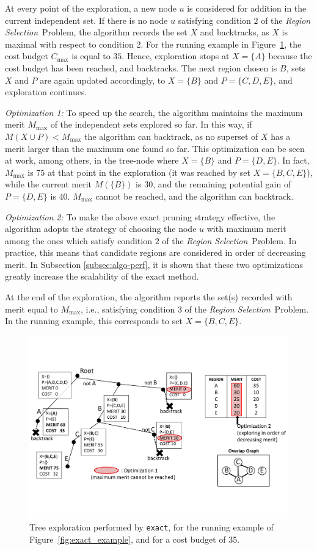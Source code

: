 \documentclass[]{usiinfthesis}
\newcommand{\exact}{\texttt{exact}}
\newcommand{\rsprobname}{\emph{Region Selection}}
\begin{document}
At every point of the exploration, a new node $u$ is considered for
addition in the current independent set. If there is no node $u$
satisfying condition $2$ of the \rsprobname\ Problem, the algorithm
records the set $X$ and backtracks, as $X$ is maximal with respect to
condition $2$.  For the running example in
Figure~\ref{fig:exact_tree}, the cost budget $C_{\max}$ is equal to
$35$. Hence, exploration stops at $X=\{A\}$ because the cost budget
has been reached, and backtracks. The next region chosen is $B$, sets
$X$ and $P$ are again updated accordingly, to $X=\{B\}$ and
$P=\{C,D,E\}$, and exploration continues.

\emph{Optimization 1:} To speed up the search, the algorithm maintains
the maximum merit $M_{\max}$ of the independent sets explored so
far. In this way, if $M(X\cup P) < M_{\max}$ the algorithm can
backtrack, as no superset of $X$ has a merit larger than the maximum
one found so far. This optimization can be seen at work, among others,
in the tree-node where $X=\{B\}$ and $P=\{D,E\}$. In fact, $M_{\max}$
is $75$ at that point in the exploration (it was reached by set
$X=\{B,C,E\}$), while the current merit $M(\{B\})$ is $30$, and the
remaining potential gain of $P=\{D,E\}$ is $40$. $M_{\max}$ cannot be
reached, and the algorithm can backtrack.

\emph{Optimization 2:} To make the above exact pruning strategy
effective, the algorithm adopts the strategy of choosing the node $u$
with maximum merit among the ones which satisfy condition $2$ of the
\rsprobname\ Problem. In practice, this means that candidate regions are
considered in order of decreasing merit. In Subsection
\ref{subsec:algo-perf}, it is shown that these two optimizations greatly
increase the scalability of the exact method.

At the end of the exploration, the algorithm reports the set(s)
recorded with merit equal to $M_{\max}$, i.e., satisfying condition
$3$ of the \rsprobname\ Problem. In the running example, this
corresponds to set $X=\{B,C,E\}$.

\begin{figure}[t]
\centering
\includegraphics[width= .9 \linewidth]{Figs/exact_tree.pdf}
\caption{Tree exploration performed by \exact, for the running example
  of Figure~\ref{fig:exact_example}, and for a cost budget of 35.}
\label{fig:exact_tree}
\end{figure}
\end{document}
